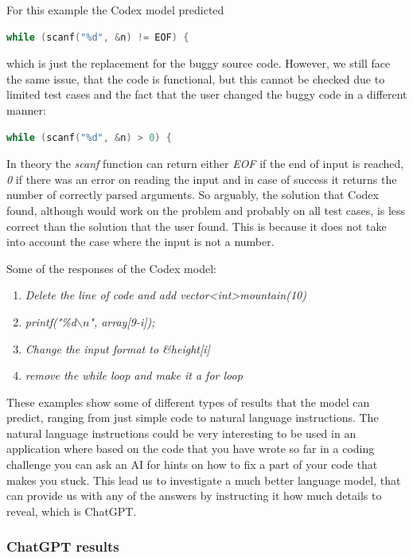 \documentclass[12pt,a4paper]{report}
\begin{document}
For this example the Codex model predicted 

\begin{lstlisting}[language=C++]
while (scanf("%d", &n) != EOF) {
\end{lstlisting}

which is just the replacement for the buggy source code. However, we still face the same issue, that the code is functional, but this cannot be checked due to limited test cases and the fact that the user changed the buggy code in a different manner:

\begin{lstlisting}[language=C++]
while (scanf("%d", &n) > 0) {
\end{lstlisting}

In theory the \textit{scanf} function can return either \textit{EOF} if the end of input is reached, \textit{0} if there was an error on reading the input and in case of success it returns the number of correctly parsed arguments. So arguably, the solution that Codex found, although would work on the problem and probably on all test cases, is less correct than the solution that the user found. This is because it does not take into account the case where the input is not a number. 

Some of the responses of the Codex model:

\begin{enumerate}
\item \textit{Delete the line of code and add vector\textless{int}\textgreater mountain(10)}
\item \textit{printf("\%d$\backslash{n}$", array[9-i]);}
\item \textit{Change the input format to \&height[i]}
\item \textit{remove the while loop and make it a for loop}
\end{enumerate}

These examples show some of different types of results that the model can predict, ranging from just simple code to natural language instructions. The natural language instructions could be very interesting to be used in an application where based on the code that you have wrote so far in a coding challenge you can ask an AI for hints on how to fix a part of your code that makes you stuck. This lead us to investigate a much better language model, that can provide us with any of the answers by instructing it how much details to reveal, which is ChatGPT.

\subsubsection{ChatGPT results}
\end{document}
